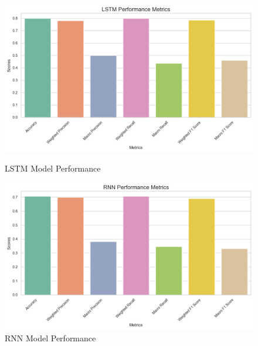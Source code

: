 \begin{figure}[H]
	\begin{minipage}{0.48\textwidth}
		\centering
		\includegraphics[width=\linewidth]{img/paper_2/LSTM.png}
		\caption{LSTM Model Performance}
		\label{fig:lstm_performance}
	\end{minipage}
	\hfill
	\begin{minipage}{0.48\textwidth}
		\centering
		\includegraphics[width=\linewidth]{img/paper_2/RNN.png}
		\caption{RNN Model Performance}
		\label{fig:rnn_performance}
	\end{minipage}
\end{figure}
